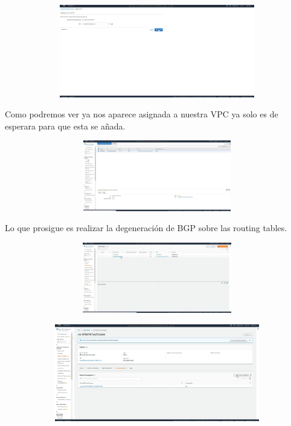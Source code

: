 \documentclass{article} %
\begin{document}
\noindent \includegraphics*[width=5.56in, height=1.59in, trim=0.00in 3.18in 4.68in 0.00in]{image14}

\noindent 

\noindent 

\noindent Como podremos ver ya nos aparece asignada a nuestra VPC ya solo es de esperara para que esta se a\~{n}ada. 

\noindent \includegraphics*[width=6.75in, height=1.21in, trim=0.00in 4.78in 5.72in 0.00in]{image15}

\noindent 

\noindent Lo que prosigue es realizar la degeneraci\'{o}n de BGP sobre las routing tables. 

\noindent 

\noindent \includegraphics*[width=5.92in, height=1.21in, trim=0.00in 2.80in 2.85in 0.00in]{image16}

\noindent 

\noindent 

\noindent \includegraphics*[width=6.04in, height=1.67in, trim=0.68in 1.49in 0.10in 0.10in]{image17}
\end{document}
